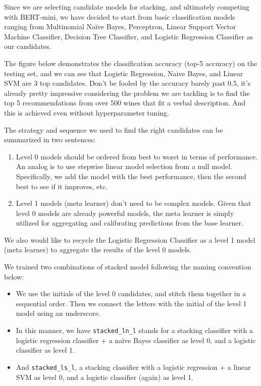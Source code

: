 \documentclass[
]{kaohandt}
\begin{document}
Since we are selecting candidate models for stacking, and ultimately competing with BERT-mini, we have decided to start from basic classification models ranging from Multinomial Naïve Bayes, Perceptron, Linear Support Vector Machine Classifier, Decision Tree Classifier, and Logistic Regression Classifier as our candidates.

The figure below demonstrates the classification accuracy (top-5 accuracy) on the testing set, and we can see that Logistic Regression, Naive Bayes, and Linear SVM are 3 top candidates. Don’t be fooled by the accuracy barely past 0.5, it’s already pretty impressive considering the problem we are tackling is to find the top 5 recommendations from over 500 wines that fit a verbal description. And this is achieved even without hyperparameter tuning.

The strategy and sequence we used to find the right candidates can be summarized in two sentences:

\begin{enumerate}
	\item Level 0 models should be ordered from best to worst in terms of performance. An analog is to use stepwise linear model selection from a null model. Specifically, we add the model with the best performance, then the second best to see if it improves, etc.
	\item Level 1 models (meta learner) don’t need to be complex models. Given that level 0 models are already powerful models, the meta learner is simply utilized for aggregating and calibrating predictions from the base learner.
\end{enumerate}

We also would like to recycle the Logistic Regression Classifier as a level 1 model (meta learner) to aggregate the results of the level 0 models.

We trained two combinations of stacked model following the naming convention below:

\begin{itemize}
	\item We use the initials of the level 0 candidates, and stitch them together in a sequential order. Then we connect the letters with the initial of the level 1 model using an underscore.
	\item In this manner, we have \texttt{stacked\_ln\_l} stands for a stacking classifier with a logistic regression classifier + a naïve Bayes classifier as level 0, and a logistic classifier as level 1.
	\item And \texttt{stacked\_ls\_l}, a stacking classifier with a logistic regression + a linear SVM as level 0, and a logistic classifier (again) as level 1.
\end{itemize}
\end{document}
